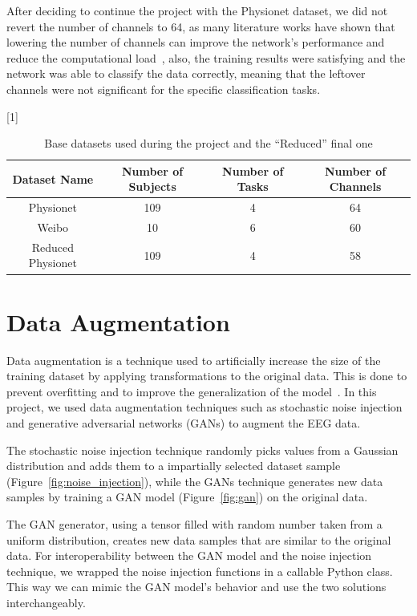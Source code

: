 After deciding to continue the project with the Physionet dataset, we did not revert the number of channels to 64, as many literature works have shown that lowering the number of channels can improve the network's performance and reduce the computational load~\cite{faye2022eeg}, also, the training results were satisfying and the network was able to classify the data correctly, meaning that the leftover channels were not significant for the specific classification tasks.
\begin{table}[!htbp]
    \centering
    \scalebox{.8}[1]{
    \begin{tabular}{|c|c|c|c|}
        \hline
        \textbf{Dataset Name} & \textbf{Number of Subjects} & \textbf{Number of Tasks} & \textbf{Number of Channels}\\
        \hline
        \hline
        Physionet & 109 & 4 & 64\\
        \hline
        Weibo & 10 & 6 & 60\\
        \hline
        \hline
        Reduced Physionet & 109 & 4 & 58\\
        \hline
    \end{tabular}
    }
    \caption{Base datasets used during the project and the ``Reduced'' final one}\label{tab:datasamples}
\end{table}


\section{Data Augmentation}
Data augmentation is a technique used to artificially increase the size of the training dataset by applying transformations to the original data.
This is done to prevent overfitting and to improve the generalization of the model~\cite{wen2020time}.
In this project, we used data augmentation techniques such as stochastic noise injection and generative adversarial networks (GANs) to augment the EEG data.

The stochastic noise injection technique randomly picks values from a Gaussian distribution and adds them to a impartially selected dataset sample (Figure~\ref{fig:noise_injection}), while the GANs technique generates new data samples by training a GAN model (Figure~\ref{fig:gan}) on the original data.

The GAN generator, using a tensor filled with random number taken from a uniform distribution, creates new data samples that are similar to the original data.
For interoperability between the GAN model and the noise injection technique, we wrapped the noise injection functions in a callable Python class.
This way we can mimic the GAN model's behavior and use the two solutions interchangeably.

